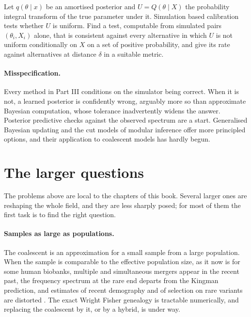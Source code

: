 \begin{question}\label{future:q:calib}
Let $q(\theta\mid x)$ be an amortised posterior and $U=Q(\theta\mid X)$ the probability integral
transform of the true parameter under it. Simulation based calibration tests whether $U$ is
uniform. Find a test, computable from simulated pairs $(\theta_i,X_i)$ alone, that is consistent
against every alternative in which $U$ is not uniform conditionally on $X$ on a set of positive
probability, and give its rate against alternatives at distance $\delta$ in a suitable metric.
\end{question}

\paragraph{Misspecification.} Every method in Part III conditions on the simulator being correct.
When it is not, a learned posterior is confidently wrong, arguably more so than approximate Bayesian
computation, whose tolerance inadvertently widens the answer. Posterior predictive checks against
the observed spectrum are a start. Generalised Bayesian updating and the cut models of modular
inference offer more principled options, and their application to coalescent models has hardly
begun.

\section{The larger questions}

The problems above are local to the chapters of this book. Several larger ones are reshaping the
whole field, and they are less sharply posed; for most of them the first task is to find the right
question.

\paragraph{Samples as large as populations.} The coalescent is an approximation for a small sample
from a large population. When the sample is comparable to the effective population size, as it now
is for some human biobanks, multiple and simultaneous mergers appear in the recent past, the
frequency spectrum at the rare end departs from the Kingman prediction, and estimates of recent
demography and of selection on rare variants are distorted \citep{future:bhaskar2014}. The exact
Wright Fisher genealogy is tractable numerically, and replacing the coalescent by it, or by a
hybrid, is under way.

